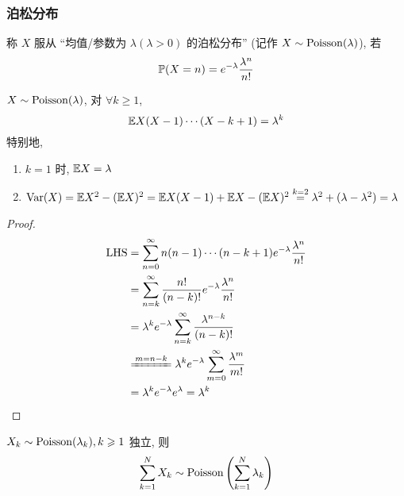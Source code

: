 \subsubsection{泊松分布}

\begin{definition}
    称 $X$ 服从 ``均值/参数为 $\lambda(\lambda>0)$ 的泊松分布'' (记作 $X\sim \operatorname{Poisson}(\lambda)$), 若 
    \begin{equation}
\mathbb{P}(X=n)=e^{-\lambda}\frac{\lambda^n}{n!}
\end{equation}
\end{definition}

\begin{property}[矩]
$X\sim \operatorname{Poisson}(\lambda)$, 对 $\forall k\geq 1$, 
\begin{equation}
\mathbb E X(X-1)\cdots (X-k+1)=\lambda^k
\end{equation}
特别地, 
\begin{enumerate}
    \item $k=1$ 时, $\mathbb E X=\lambda$
    \item $\operatorname{Var}(X)=\mathbb E X^2-(\mathbb E X)^2=\mathbb E X(X-1)+\mathbb E X-(\mathbb E X)^2\overset{k=2}{=}\lambda^2+(\lambda-\lambda^2)=\lambda$
\end{enumerate}
\end{property}

\begin{proof}
    \[
    \begin{aligned}
        \LHS &=\sum_{n=0}^{\infty}n(n-1)\cdots (n-k+1)e^{-\lambda}\frac{\lambda^n}{n!}\\
        &=\sum_{n=k}^{\infty}\frac{n!}{(n-k)!}e^{-\lambda}\frac{\lambda^n}{n!}\\
        &=\lambda^k e^{-\lambda}\sum_{n=k}^{\infty}\frac{\lambda^{n-k}}{(n-k)!}\\
        &\xlongequal{m=n-k} \lambda^ke^{-\lambda}\sum_{m=0}^{\infty}\frac{\lambda^m}{m!}\\
        &=\lambda^k e^{-\lambda}e^{\lambda}=\lambda^k
    \end{aligned}
    \]
\end{proof}

\begin{theorem}
    $X_k\sim \operatorname{Poisson}(\lambda_k),k\geqslant 1$ 独立, 则
    \begin{equation}
\sum_{k=1}^N X_k\sim \operatorname{Poisson}\left(\sum_{k=1}^N \lambda_k\right)
\end{equation}
\end{theorem}

